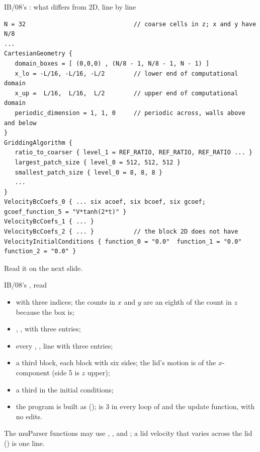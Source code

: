 \documentclass[aspectratio=169,11pt]{beamer}
\begin{document}
\begin{frame}[fragile]{IB/08's : what differs from 2D, line by line}
\label{fr:input3d}
\begin{lstlisting}[style=inputtiny]
N = 32                              // coarse cells in z; x and y have N/8
...
CartesianGeometry {
   domain_boxes = [ (0,0,0) , (N/8 - 1, N/8 - 1, N - 1) ]
   x_lo = -L/16, -L/16, -L/2        // lower end of computational domain
   x_up =  L/16,  L/16,  L/2        // upper end of computational domain
   periodic_dimension = 1, 1, 0     // periodic across, walls above and below
}
GriddingAlgorithm {
   ratio_to_coarser { level_1 = REF_RATIO, REF_RATIO, REF_RATIO ... }
   largest_patch_size { level_0 = 512, 512, 512 }
   smallest_patch_size { level_0 = 8, 8, 8 }
   ...
}
VelocityBcCoefs_0 { ... six acoef, six bcoef, six gcoef; gcoef_function_5 = "V*tanh(2*t)" }
VelocityBcCoefs_1 { ... }
VelocityBcCoefs_2 { ... }           // the block 2D does not have
VelocityInitialConditions { function_0 = "0.0"  function_1 = "0.0"  function_2 = "0.0" }
\end{lstlisting}
\footnotesize Read it on the next slide.
\end{frame}

\begin{frame}{IB/08's , read}
\label{fr:input3d2}
\small
\begin{itemize}
  \item {} with three indices; the counts in $x$ and $y$ are an eighth of the count in $z$ because the box is;
  \item {}, ,  with three entries;
  \item every , ,  line with three entries;
  \item a third  block, each block with six sides; the lid's motion is  of the $x$-component (side 5 is $z$ upper);
  \item a third  in the initial conditions;
  \item the program is built as  ();  is 3 in every loop of  and the update function, with no edits.
\end{itemize}
\vspace{1mm}
\footnotesize The muParser functions may use , ,  and ; a lid velocity that varies across the lid () is one line.
\end{frame}
\end{document}
